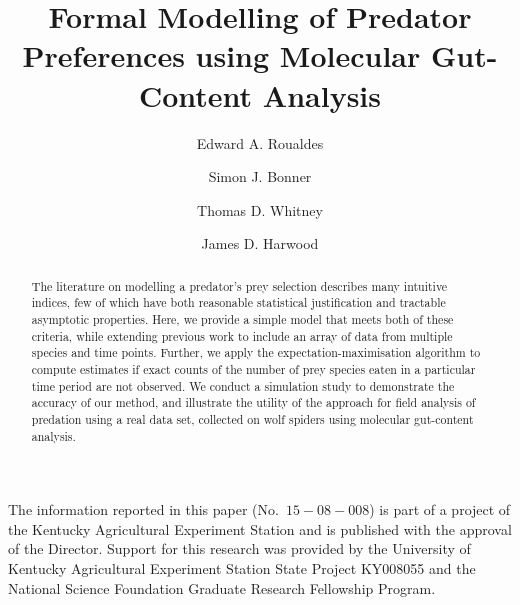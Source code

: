\documentclass[smallextended]{svjour3}
\begin{document}
\title{Formal Modelling of Predator Preferences using Molecular Gut-Content Analysis}
\author{Edward A. Roualdes \and Simon J. Bonner \and Thomas D. Whitney \and James D. Harwood}

\maketitle

\begin{abstract}
  The literature on modelling a predator's prey selection describes many intuitive indices, few of which have both reasonable statistical justification and tractable asymptotic properties.  Here, we provide a simple model that meets both of these criteria, while extending previous work to include an array of data from multiple species and time points.  Further, we apply the expectation-maximisation algorithm to compute estimates if exact counts of the number of prey species eaten in a particular time period are not observed.  We conduct a simulation study to demonstrate the accuracy of our method, and illustrate the utility of the approach for field analysis of predation using a real data set, collected on wolf spiders using molecular gut-content analysis.
\end{abstract}

\begin{acknowledgements}
The information reported in this paper (No.\ $15-08-008$) is part of a project of the Kentucky Agricultural Experiment Station and is published with the approval of the Director.  Support for this research was provided by the University of Kentucky Agricultural Experiment Station State Project KY008055 and the National Science Foundation Graduate Research Fellowship Program.  
\end{acknowledgements}
\end{document}
